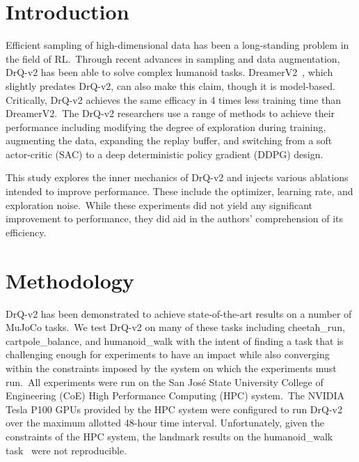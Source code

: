 \documentclass[conference]{./IEEEtran/IEEEtran} %
\begin{document}
    \section{Introduction}\label{sec:introduction}
    Efficient sampling of high-dimensional data has been a long-standing problem in the field of RL.\ Through recent
    advances in sampling and data augmentation, DrQ-v2 has been able to solve complex humanoid tasks.
    DreamerV2~\cite{DreamerV2}, which slightly predates DrQ-v2, can also make this claim, though it is model-based.
    Critically, DrQ-v2 achieves the same efficacy in 4 times less training time than DreamerV2.\ The DrQ-v2 researchers
    use a range of methods to achieve their performance including modifying the degree of exploration during training,
    augmenting the data, expanding the replay buffer, and switching from a soft actor-critic (SAC) to a deep
    deterministic policy gradient (DDPG) design.


    This study explores the inner mechanics of DrQ-v2 and injects various ablations intended to improve performance.
    These include the optimizer, learning rate, and exploration noise.\ While these experiments did not yield any
    significant improvement to performance, they did aid in the authors' comprehension of its efficiency.

    \section{Methodology}\label{sec:methodology}
    DrQ-v2 has been demonstrated to achieve state-of-the-art results on a number of MuJoCo tasks.\ We test DrQ-v2 on
    many of these tasks including cheetah\_run, cartpole\_balance, and humanoid\_walk with the intent of finding a
    task that is challenging enough for experiments to have an impact while also converging within the constraints
    imposed by the system on which the experiments must run.\ All experiments were run on the San Jos\'e State
    University College of Engineering (CoE) High Performance Computing (HPC) system.\ The NVIDIA Tesla P100 GPUs
    provided by the HPC system were configured to run DrQ-v2 over the maximum allotted 48-hour time interval.
    Unfortunately, given the constraints of the HPC system, the landmark results on the humanoid\_walk task~\cite{DrQv2}
    were not reproducible.
\end{document}
